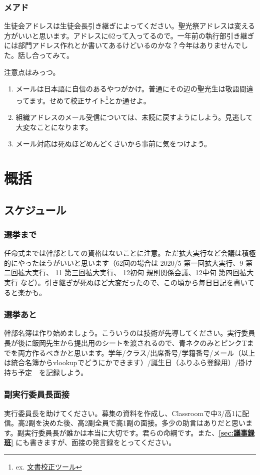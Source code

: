 \documentclass[dvipdfmx,jb5]{jarticle}
\begin{document}
\subsubsection{メアド}
生徒会アドレスは生徒会長引き継ぎによってください。聖光祭アドレスは変える方がいいと思います。アドレスに62って入ってるので。一年前の執行部引き継ぎには部門アドレス作れとか書いてあるけどいるのかな？今年はありませんでした。話し合ってみて。

注意点はみっつ。
\begin{enumerate}
  \item メールは日本語に自信のあるやつがかけ。普通にその辺の聖光生は敬語間違ってます。せめて校正サイト\footnote{ex. \href{https://so-zou.jp/web-app/text/proofreading/}{文書校正ツール}}とか通せよ。
  \item 組織アドレスのメール受信については、未読に戻すようにしよう。見逃して大変なことになります。
  \item メール対応は死ぬほどめんどくさいから事前に気をつけよう。
\end{enumerate}

\section{概括}
\subsection{スケジュール}
\subsubsection{選挙まで}
任命式までは幹部としての資格はないことに注意。ただ拡大実行など会議は積極的にやったほうがいいと思います（62回の場合は 2020/5 第一回拡大実行、9 第二回拡大実行、 11 第三回拡大実行、 12初旬 規則関係会議、12中旬 第四回拡大実行 など）。引き継ぎが死ぬほど大変だったので、この頃から毎日日記を書いてると楽かも。

\subsubsection{選挙あと}
幹部名簿は作り始めましょう。こういうのは技術が先導してください。実行委員長が後に飯岡先生から提出用のシートを渡されるので、青ネクのみとピンクTまでを両方作るべきかと思います。学年/クラス/出席番号/学籍番号/メール（以上は統合名簿からvlookupでどうにかできます）/誕生日（ふりふら登録用）/掛け持ち予定　を記録しよう。

\subsubsection{副実行委員長面接}
実行委員長を助けてください。募集の資料を作成し、Classroomで中3/高1に配信。高2副を決めた後、高2副全員で高1副の面接。多少の助言はありだと思います。副実行委員長が誰かは本当に大切です。君らの命綱です。また、{\bf \ref{sec:議事録班}} にも書きますが、面接の発言録をとってください。
\end{document}
